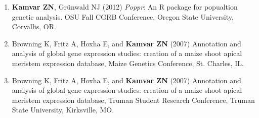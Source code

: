 \begin{enumerate}[leftmargin = 14pt]
	\vspace{3pt}

	\item \textbf{Kamvar ZN}, Gr\"unwald NJ (2012) \textit{Poppr}: An R package
	for popualtion genetic analysis. OSU Fall CGRB Conference, Oregon State
	University, Corvallis, OR.

	\vspace{3pt}

	\item Browning K, Fritz A, Hoxha E, and \textbf{Kamvar ZN} (2007) Annotation
	and analysis of global gene expression studies: creation of a maize shoot
	apical meristem expression database, Maize Genetics Conference, St. Charles,
	IL.

	\vspace{3pt}

	\item Browning K, Fritz A, Hoxha E, and \textbf{Kamvar ZN} (2007) Annotation
	and analysis of global gene expression studies: creation of a maize shoot
	apical meristem expression database, Truman Student Research Conference,
	Truman State University, Kirksville, MO.

\end{enumerate}








